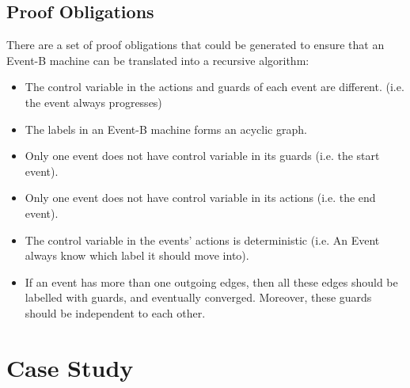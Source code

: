 \documentclass{easychair}
\begin{document}
\subsection{Proof Obligations}
There are a set of proof obligations that could be generated to ensure that an Event-B machine can be translated into a recursive algorithm:
\begin{itemize}
	\item The control variable in the actions and guards of each event are different. (i.e. the event always progresses)
	\item The labels in an Event-B machine forms an acyclic graph.
	\item Only one event does not have control variable in its guards (i.e. the start event).
	\item Only one event does not have control variable in its actions (i.e. the end event).
	\item The control variable in the events' actions is deterministic (i.e. An Event always know which label it should move into).
	\item If an event has more than one outgoing edges, then all these edges should be labelled with guards, and eventually converged. Moreover, these guards should be independent to each other.
	
\end{itemize}





\newpage
\section{Case Study}\label{sect:result}
\end{document}
